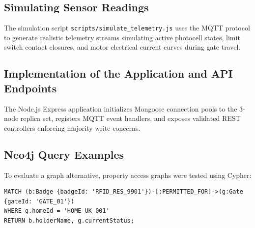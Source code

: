 \documentclass[11pt,a4paper]{article}
\begin{document}
\subsection{Simulating Sensor Readings}
The simulation script \texttt{scripts/simulate\_telemetry.js} uses the MQTT protocol to generate realistic telemetry streams simulating active photocell states, limit switch contact closures, and motor electrical current curves during gate travel.

\subsection{Implementation of the Application and API Endpoints}
The Node.js Express application initializes Mongoose connection pools to the 3-node replica set, registers MQTT event handlers, and exposes validated REST controllers enforcing majority write concerns.

\subsection{Neo4j Query Examples}
To evaluate a graph alternative, property access graphs were tested using Cypher:
\begin{lstlisting}
MATCH (b:Badge {badgeId: 'RFID_RES_9901'})-[:PERMITTED_FOR]->(g:Gate {gateId: 'GATE_01'})
WHERE g.homeId = 'HOME_UK_001'
RETURN b.holderName, g.currentStatus;
\end{lstlisting}

\newpage
{}
\end{document}
